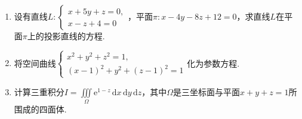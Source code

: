 \documentclass[../Main.tex]{subfiles}
\begin{document}
\begin{enumerate}
    \item 设有直线$L:
              \begin{cases}
                  x+5y+z=0, \\
                  x-z+4=0
              \end{cases}$，平面$\pi:x-4y-8z+12=0$，求直线$L$在平面$\pi$上的投影直线的方程.
          \vspace{10em}

    \item 将空间曲线$\begin{cases}
                  x^{2}+y^{2}+z^{2}=1, \\
                  (x-1)^{2}+y^{2}+(z-1)^{2}=1
              \end{cases}$化为参数方程.
          \vspace{10em}

    \item 计算三重积分$I=\iiint\limits_{\Omega}\mathrm{e}^{1-z}\,\mathrm{d}x\,\mathrm{d}
              y\,\mathrm{d}z$，其中$\Omega$是三坐标面与平面$x+y+z=1$所围成的四面体.
          \vspace{10em}
\end{enumerate}
\end{document}
